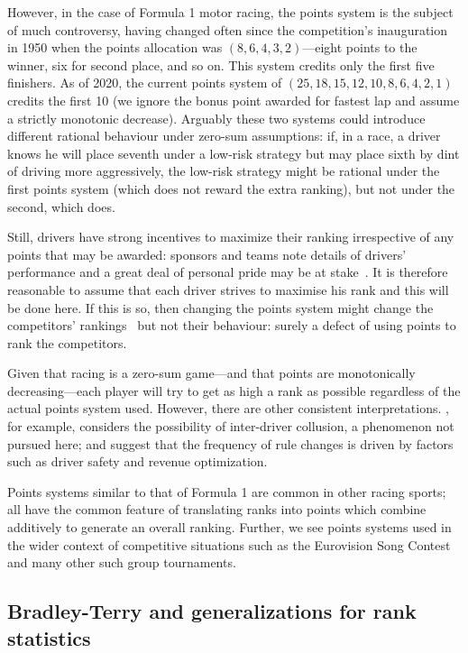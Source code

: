 \documentclass{elsarticle}
\begin{document}
However, in the case of Formula 1 motor racing, the points system is
the subject of much controversy, having changed often since the
competition's inauguration in 1950 when the points allocation was
$(8,6,4,3,2)$---eight points to the winner, six for second place, and
so on.  This system credits only the first five finishers.  As of
2020, the current points system of $(25,18,15,12,10,8,6,4,2,1)$
credits the first 10 (we ignore the bonus point awarded for fastest
lap and assume a strictly monotonic decrease).  Arguably these two
systems could introduce different rational behaviour under zero-sum
assumptions: if, in a race, a driver knows he will place seventh under
a low-risk strategy but may place sixth by dint of driving more
aggressively, the low-risk strategy might be rational under the first
points system (which does not reward the extra ranking), but not under
the second, which does.

Still, drivers have strong incentives to maximize their ranking
irrespective of any points that may be awarded: sponsors and teams
note details of drivers' performance and a great deal of personal
pride may be at stake~\citep{gayrees2019}.  It is therefore reasonable
to assume that each driver strives to maximise his rank and this will
be done here.  If this is so, then changing the points system might
change the competitors' rankings~\citep{wood2020} but not their
behaviour: surely a defect of using points to rank the competitors.

Given that racing is a zero-sum game---and that points are
monotonically decreasing---each player will try to get as high a rank
as possible regardless of the actual points system used.  However,
there are other consistent interpretations. \cite{bakhrankova2011},
for example, considers the possibility of inter-driver collusion, a
phenomenon not pursued here; and \cite{mastromarco2009} suggest that
the frequency of rule changes is driven by factors such as driver
safety and revenue optimization.

Points systems similar to that of Formula 1 are common in other racing
sports; all have the common feature of translating ranks into points
which combine additively to generate an overall ranking.  Further, we
see points systems used in the wider context of competitive situations
such as the Eurovision Song Contest and many other such group
tournaments.

\subsection{Bradley-Terry and generalizations for rank
statistics}\label{bradley-terry-and-generalizations-for-rank-statistics}
\end{document}

